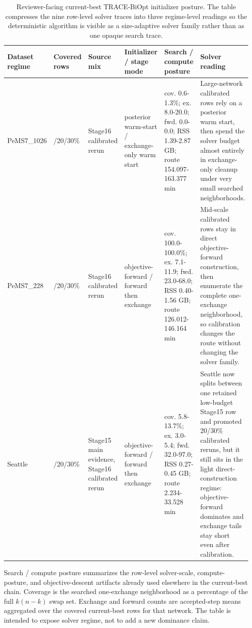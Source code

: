 \begin{table}[pos=htbp]
\centering
\caption{Reviewer-facing current-best TRACE-BiOpt initializer posture. The table compresses the nine row-level solver traces into three regime-level readings so the deterministic algorithm is visible as a size-adaptive solver family rather than as one opaque search trace.}
\label{tab:trace-biopt-initializer-posture}
\scriptsize
\begin{tabularx}{\textwidth}{>{\raggedright\arraybackslash}p{}>{\raggedright\arraybackslash}p{}>{\raggedright\arraybackslash}p{}>{\raggedright\arraybackslash}p{}>{\raggedright\arraybackslash}p{}>{\raggedright\arraybackslash}X}
\toprule
Dataset regime & Covered rows & Source mix & Initializer / stage mode & Search / compute posture & Solver reading \\
\midrule
PeMS7\_1026 & 10/20/30\% & Stage16 calibrated rerun & posterior warm-start / exchange-only warm start & cov. 0.6-1.3\%; ex. 8.0-20.0; fwd. 0.0-0.0; RSS 1.39-2.87 GB; route 154.097-163.377 min & Large-network calibrated rows rely on a posterior warm start, then spend the solver budget almost entirely in exchange-only cleanup under very small searched neighborhoods. \\
PeMS7\_228 & 10/20/30\% & Stage16 calibrated rerun & objective-forward / forward then exchange & cov. 100.0-100.0\%; ex. 7.1-11.9; fwd. 23.0-68.0; RSS 0.40-1.56 GB; route 126.012-146.164 min & Mid-scale calibrated rows stay in direct objective-forward construction, then enumerate the complete one-exchange neighborhood, so calibration changes the route without changing the solver family. \\
Seattle & 10/20/30\% & Stage15 main evidence, Stage16 calibrated rerun & objective-forward / forward then exchange & cov. 5.8-13.7\%; ex. 3.0-5.4; fwd. 32.0-97.0; RSS 0.27-0.45 GB; route 2.234-33.528 min & Seattle now splits between one retained low-budget Stage15 row and promoted 20/30\% calibrated reruns, but it still sits in the light direct-construction regime: objective-forward dominates and exchange tails stay short even after calibration. \\
\bottomrule
\end{tabularx}
\begin{flushleft}\footnotesize Search / compute posture summarizes the row-level solver-scale, compute-posture, and objective-descent artifacts already used elsewhere in the current-best chain. Coverage is the searched one-exchange neighborhood as a percentage of the full $k(n-k)$ swap set. Exchange and forward counts are accepted-step means aggregated over the covered current-best rows for that network. The table is intended to expose solver regime, not to add a new dominance claim.\end{flushleft}
\end{table}
